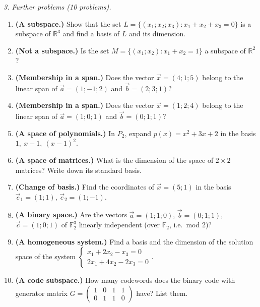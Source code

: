 \emph{3. Further problems (10 problems).}
\bigskip
\begin{enumerate}[label=\arabic*., leftmargin=*]
\item \textbf{(A subspace.)} Show that the set $L=\{(x_1;x_2;x_3)\colon x_1+x_2+x_3=0\}$ is a subspace of $\mathbb R^3$ and find a basis of $L$ and its dimension.
\item \textbf{(Not a subspace.)} Is the set $M=\{(x_1;x_2)\colon x_1+x_2=1\}$ a subspace of $\mathbb R^2$?
\item \textbf{(Membership in a span.)} Does the vector $\vec x=(4;1;5)$ belong to the linear span of $\vec a=(1;-1;2)$ and $\vec b=(2;3;1)$?
\item \textbf{(Membership in a span.)} Does the vector $\vec x=(1;2;4)$ belong to the linear span of $\vec a=(1;0;1)$ and $\vec b=(0;1;1)$?
\item \textbf{(A space of polynomials.)} In $P_2$, expand $p(x)=x^2+3x+2$ in the basis $1,\ x-1,\ (x-1)^2$.
\item \textbf{(A space of matrices.)} What is the dimension of the space of $2\times2$ matrices? Write down its standard basis.
\item \textbf{(Change of basis.)} Find the coordinates of $\vec x=(5;1)$ in the basis $\vec e_1=(1;1)$, $\vec e_2=(1;-1)$.
\item \textbf{(A binary space.)} Are the vectors $\vec a=(1;1;0)$, $\vec b=(0;1;1)$, $\vec c=(1;0;1)$ of $\mathbb{F}_2^3$ linearly independent (over $\mathbb F_2$, i.e.\ mod 2)?
\item \textbf{(A homogeneous system.)} Find a basis and the dimension of the solution space of the system $\begin{cases}x_1+2x_2-x_3=0\\2x_1+4x_2-2x_3=0\end{cases}$.
\item \textbf{(A code subspace.)} How many codewords does the binary code with generator matrix $G=\left(\begin{smallmatrix}1&0&1&1\\0&1&1&0\end{smallmatrix}\right)$ have? List them.
\end{enumerate}

